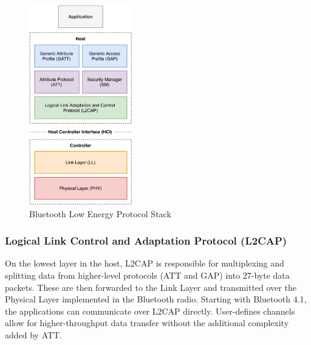 \begin{figure}
    \centering
    \includegraphics[width=0.40\textwidth]{diagrams/ble-stack}
    \caption{Bluetooth Low Energy Protocol Stack \cite{blebook}}
    \label{ble_stack}
\end{figure}

\subsubsection{Logical Link Control and Adaptation Protocol (L2CAP)}

On the lowest layer in the host, L2CAP is responsible for multiplexing and splitting data from higher-level protocols (ATT and GAP) into 27-byte data packets. These are then forwarded to the Link Layer and transmitted over the Physical Layer implemented in the Bluetooth radio. Starting with Bluetooth 4.1, the applications can communicate over L2CAP directly. User-defines channels allow for higher-throughput data transfer without the additional complexity added by ATT.



